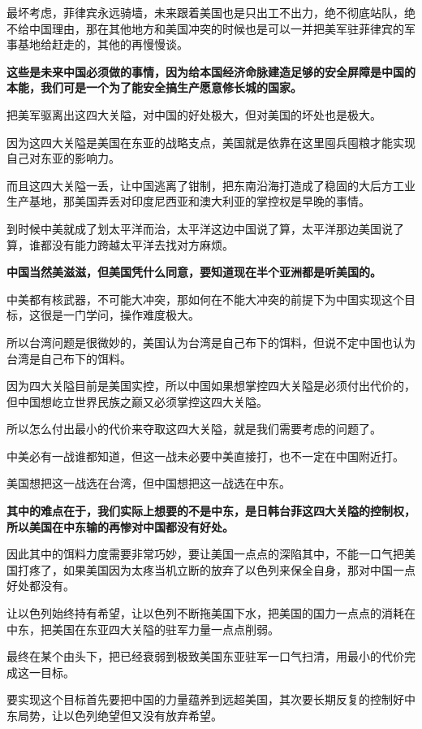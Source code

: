 \documentclass[UTF8, 11pt, oneside]{ctexart}
\newcommand{\zd}[1]{\textbf{\textcolor[RGB]{123,12,0}{#1}}} %
\begin{document}
最坏考虑，菲律宾永远骑墙，未来跟着美国也是只出工不出力，绝不彻底站队，绝不给中国理由，那在其他地方和美国冲突的时候也是可以一并把美军驻菲律宾的军事基地给赶走的，其他的再慢慢谈。

\zd{这些是未来中国必须做的事情，因为给本国经济命脉建造足够的安全屏障是中国的本能，我们可是一个为了能安全搞生产愿意修长城的国家。}

把美军驱离出这四大关隘，对中国的好处极大，但对美国的坏处也是极大。

因为这四大关隘是美国在东亚的战略支点，美国就是依靠在这里囤兵囤粮才能实现自己对东亚的影响力。

而且这四大关隘一丢，让中国逃离了钳制，把东南沿海打造成了稳固的大后方工业生产基地，那美国弄丢对印度尼西亚和澳大利亚的掌控权是早晚的事情。

到时候中美就成了划太平洋而治，太平洋这边中国说了算，太平洋那边美国说了算，谁都没有能力跨越太平洋去找对方麻烦。

\zd{中国当然美滋滋，但美国凭什么同意，要知道现在半个亚洲都是听美国的。}

中美都有核武器，不可能大冲突，那如何在不能大冲突的前提下为中国实现这个目标，这很是一门学问，操作难度极大。

所以台湾问题是很微妙的，美国认为台湾是自己布下的饵料，但说不定中国也认为台湾是自己布下的饵料。

因为四大关隘目前是美国实控，所以中国如果想掌控四大关隘是必须付出代价的，但中国想屹立世界民族之巅又必须掌控这四大关隘。

所以怎么付出最小的代价来夺取这四大关隘，就是我们需要考虑的问题了。

中美必有一战谁都知道，但这一战未必要中美直接打，也不一定在中国附近打。

美国想把这一战选在台湾，但中国想把这一战选在中东。

\zd{其中的难点在于，我们实际上想要的不是中东，是日韩台菲这四大关隘的控制权，所以美国在中东输的再惨对中国都没有好处。}

因此其中的饵料力度需要非常巧妙，要让美国一点点的深陷其中，不能一口气把美国打疼了，如果美国因为太疼当机立断的放弃了以色列来保全自身，那对中国一点好处都没有。

让以色列始终持有希望，让以色列不断拖美国下水，把美国的国力一点点的消耗在中东，把美国在东亚四大关隘的驻军力量一点点削弱。

最终在某个由头下，把已经衰弱到极致美国东亚驻军一口气扫清，用最小的代价完成这一目标。

要实现这个目标首先要把中国的力量蕴养到远超美国，其次要长期反复的控制好中东局势，让以色列绝望但又没有放弃希望。
\end{document}
